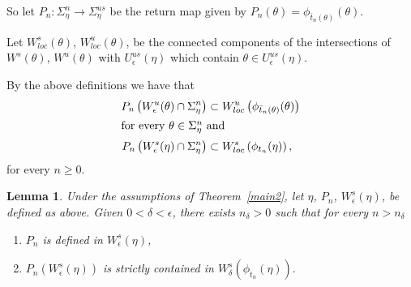 \documentclass[10pt]{amsart}
\newtheorem{lemm}[cdrthm]{Lemma}
\theoremstyle{definition}
\begin{document}
So let $P_{n} : \Sigma_{\eta}^{n} \longrightarrow \Sigma_{\eta}^{us}$ be the return map given by $P_{n}(\theta) =\phi_{\bar{t}_{n}(\theta)}(\theta) $.

Let $W^{s}_{loc}(\theta)$, $W^{u}_{loc}(\theta)$, be the connected components of the intersections of $W^{s}(\theta)$, $W^{u}(\theta)$ with $U_{\epsilon}^{us}(\eta)$ which contain $\theta \in U_{\epsilon}^{us}(\eta)$.


By the above definitions we have that
\begin{align*}
P_{n}\left(W^{u}_{\epsilon}(\theta) \cap \Sigma_{\eta}^{n}\right)&\subset W^{u}_{loc}\left(\phi_{\bar{t}_{n}(\theta)}(\theta)\right)
\\
\intertext{for every $\theta \in \Sigma^{n}_{\eta}$ and}
P_{n}\left(W^{s}_{\epsilon}(\eta) \cap \Sigma_{\eta}^{n}\right)&\subset W^{s}_{loc}\left(\phi_{t_{n}}(\eta)\right),
\end{align*}
for every $n \geq 0$.
\pagebreak
\begin{lemm}\label{contraction}
Under the assumptions of Theorem~\ref{main2}, let $\eta$, $P_{n}$, $W^{s}_{\epsilon}(\eta)$, be defined as above. Given $0 <\delta <\epsilon$, there exists $n_{\delta}>0$ such that for every $n >n_{\delta}$
\begin{enumerate}
\item \label{lemm8.3.1}$P_{n}$ is defined in $W^{s}_{\epsilon}(\eta)$,
\item \label{lemm8.3.2} $P_{n}(W^{s}_{\epsilon}(\eta))$ is strictly contained in $W^{s}_{\delta}(\phi_{t_{n}}(\eta)).$
\end{enumerate}
\end{lemm}
\end{document}

